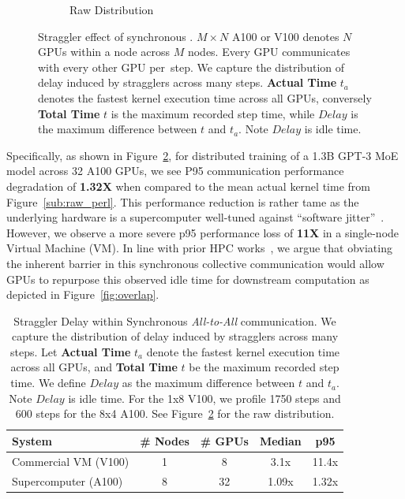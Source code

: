 \begin{figure}[!h]
\begin{subfigure}{0.4\textwidth}
        \caption{Raw Distribution}
        \label{sub:raw_az}
    \end{subfigure}
    \caption{Straggler effect of synchronous \alltoall. $M\times N$ A100 or V100 denotes
        $N$ GPUs within a node across $M$ nodes.
        Every GPU communicates with every other GPU per~\alltoall step.
        We capture the distribution of delay induced by stragglers across many steps.
        \textbf{Actual Time} $t_a$ denotes the fastest kernel execution time across all GPUs,
        conversely \textbf{Total Time} $t$ is the maximum recorded step time, while
        $Delay$ is the maximum difference between $t$ and $t_a$. Note $Delay$ is idle time.}
    \label{fig:straggler}
\end{figure}
Specifically, as shown in Figure~\ref{fig:straggler}, for distributed training of a 1.3B GPT-3 MoE model across
32 A100 GPUs, we see P95 communication performance degradation of \textbf{1.32X} when compared to the mean actual kernel time
from Figure~\ref{sub:raw_perl}.
This performance reduction is rather tame as the underlying hardware is a supercomputer well-tuned
against ``software jitter''~\cite{nerscNetworkNERSC}.
However, we observe a more severe p95 performance loss of \textbf{11X} in a single-node Virtual Machine (VM).
In line with prior HPC works~\cite{1639320, 10.1145/3545008.3545056},
we argue that obviating the inherent barrier in this synchronous collective communication would
allow GPUs to repurpose this observed idle time for downstream computation as depicted in Figure~\ref{fig:overlap}.
\begin{table}[!h]
    \centering
    \caption{Straggler Delay within Synchronous \emph{All-to-All} communication.
    We capture the distribution of delay induced by stragglers across many steps.
    Let \textbf{Actual Time} $t_a$ denote the fastest kernel execution time across all GPUs,
        and \textbf{Total Time} $t$ be the maximum recorded step time. We define
        $Delay$ as the maximum difference between $t$ and $t_a$. Note $Delay$ is idle time. For the
        1x8 V100, we profile 1750 steps and 600 steps for the 8x4 A100. See Figure~\ref{fig:straggler}
        for the raw distribution.}
    \label{tab:s_delays}
    \begin{tabular}{@{}lcccc@{}}
        \toprule
        \textbf{System}      & \multicolumn{1}{l}{\textbf{\# Nodes}} & \multicolumn{1}{l}{\textbf{\# GPUs}} & \textbf{Median} & \textbf{p95} \\ \midrule
        Commercial VM (V100) & 1                                     & 8                                    & 3.1x            & 11.4x        \\
        Supercomputer (A100) & 8                                     & 32                                   & 1.09x           & 1.32x        \\ \bottomrule
    \end{tabular}
\end{table}
